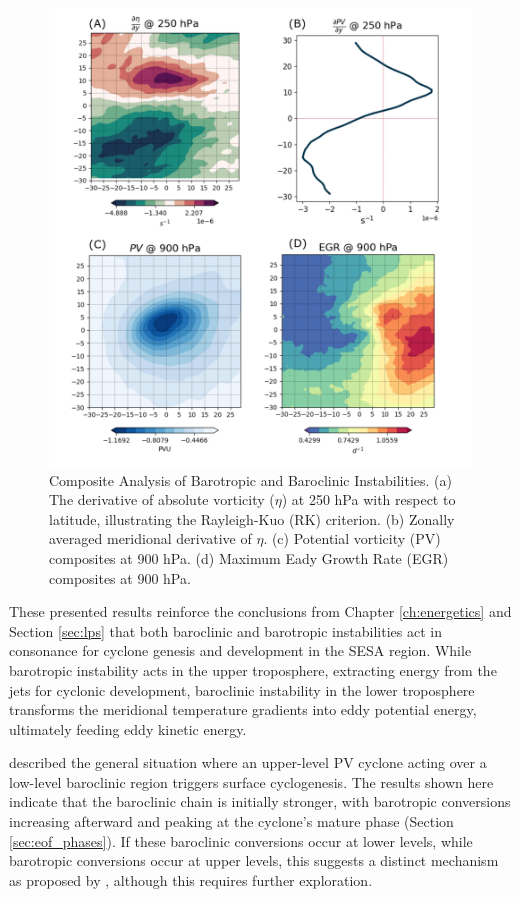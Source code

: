 \begin{figure}[!htbp]
    \centering
    \includegraphics[width=\textwidth]{figs_6/ibc_ibt_panel.pdf}
    \caption[Rayleigh Criterion and EGR]{Composite Analysis of Barotropic and Baroclinic Instabilities. (a) The derivative of absolute vorticity ($\eta$) at 250 hPa with respect to latitude, illustrating the Rayleigh-Kuo (RK) criterion. (b) Zonally averaged meridional derivative of $\eta$. (c) Potential vorticity (PV) composites at 900 hPa. (d) Maximum Eady Growth Rate (EGR) composites at 900 hPa.}
    \label{fig:ibc_ibt_panel}
\end{figure}

These presented results reinforce the conclusions from Chapter \ref{ch:energetics} and Section \ref{sec:lps} that both baroclinic and barotropic instabilities act in consonance for cyclone genesis and development in the SESA region. While barotropic instability acts in the upper troposphere, extracting energy from the jets for cyclonic development, baroclinic instability in the lower troposphere transforms the meridional temperature gradients into eddy potential energy, ultimately feeding eddy kinetic energy.

\citet{hoskins1985use} described the general situation where an upper-level PV cyclone acting over a low-level baroclinic region triggers surface cyclogenesis. The results shown here indicate that the baroclinic chain is initially stronger, with barotropic conversions increasing afterward and peaking at the cyclone's mature phase (Section \ref{sec:eof_phases}). If these baroclinic conversions occur at lower levels, while barotropic conversions occur at upper levels, this suggests a distinct mechanism as proposed by \citet{hoskins1985use}, although this requires further exploration.

